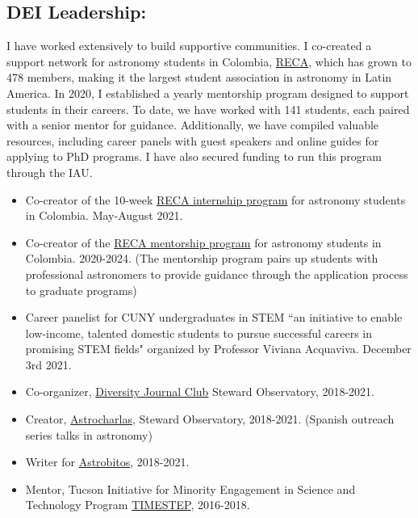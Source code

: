 \documentclass[14pt]{article}
\begin{document}
\subsection*{DEI Leadership:}

I have worked extensively to build supportive communities. I co-created a support network for astronomy students in Colombia, \href{https://www.astroreca.org/}{RECA}, which has grown to 478 members, making it the largest student association in astronomy in Latin America. In 2020, I established a yearly mentorship program designed to support students in their careers. To date, we have worked with 141 students, each paired with a senior mentor for guidance. Additionally, we have compiled valuable resources, including career panels with guest speakers and online guides for applying to PhD programs. I have also secured funding to run this program through the IAU.


\begin{itemize}
  \setlength\itemsep{0.0em}
  \renewcommand\labelitemi{$\cdot$}
\item Co-creator of the 10-week
  \href{https://recastronomia.github.io/internship/}{RECA internship program}
  for astronomy students in Colombia. May-August 2021.
\item Co-creator of the \href{https://recastronomia.github.io/mentores/}{RECA mentorship program} for astronomy students in Colombia. 2020-2024.
  (The mentorship program pairs up students with professional astronomers to
  provide guidance through the application process to graduate programs)
\item Career panelist for CUNY undergraduates in STEM ``an initiative to enable
  low-income, talented domestic students to pursue successful careers in
  promising STEM fields" organized by Professor Viviana Acquaviva. December 3rd 2021.  
\item Co-organizer,
  \href{https://www.as.arizona.edu/diversity_coffee/}{Diversity Journal Club} Steward Observatory, 2018-2021.
\item Creator, \href{https://astrocharlas.github.io/}{Astrocharlas},
Steward Observatory, 2018-2021.
 (Spanish outreach series talks in astronomy)
\item Writer for \href{https://astrobitos.org/}{Astrobitos}, 2018-2021.
\item Mentor, Tucson Initiative for Minority Engagement in Science and Technology Program \href{https://lavinia.as.arizona.edu/~timestep/}{TIMESTEP}, 2016-2018.
\end{itemize}
\end{document}
